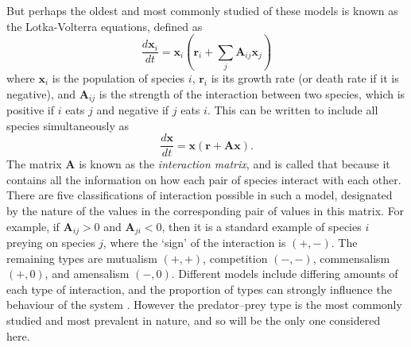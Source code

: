 But perhaps the oldest and most commonly studied of these models is known as the Lotka-Volterra equations, defined as
\begin{equation}
  \frac{d\mathbf{x}_i}{dt} = \mathbf{x}_i(\mathbf{r}_i + \sum_j\mathbf{A}_{ij}\mathbf{x}_j)
  \label{eq:lotka_volterra}
\end{equation}
where $\mathbf{x}_i$ is the population of species $i$, $\mathbf{r}_i$ is its growth rate (or death rate if it is negative), and $\mathbf{A}_{ij}$ is the strength of the interaction between two species, which is positive if $i$ eats $j$ and negative if $j$ eats $i$. 
This can be written to include all species simultaneously as
\begin{equation}
    \frac{d\mathbf{x}}{dt} = \mathbf{x}(\mathbf{r} + \mathbf{Ax}).
    \label{eq:interaction_matrix}
\end{equation}
The matrix $\mathbf{A}$ is known as the \emph{interaction matrix}, and is called that because it contains all the information on how each pair of species interact with each other.
There are five classifications of interaction possible in such a model, designated by the nature of the values in the corresponding pair of values in this matrix. For example, if $\mathbf{A}_{ij}>0$ and $\mathbf{A}_{ji}<0$, then it is a standard example of species $i$ preying on species $j$, where the `sign' of the interaction is $(+,-)$. The remaining types are mutualism $(+,+)$, competition $(-,-)$, commensalism $(+,0)$, and amensalism $(-,0)$.
Different models include differing amounts of each type of interaction, and the proportion of types can strongly influence the behaviour of the system \cite{Tang2014Correlation}. However the predator--prey type is the most commonly studied and most prevalent in nature, and so will be the only one considered here.

